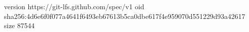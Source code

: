 version https://git-lfs.github.com/spec/v1
oid sha256:4d6e6f0f077a4641f6493eb67613b5ca0dbe617f4e959070d551229d93a42617
size 87544
